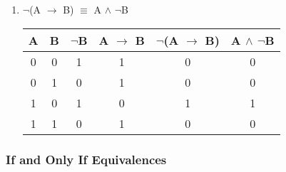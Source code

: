 \documentclass[12pt]{article}
\begin{document}
\begin{enumerate}
\begin{center}
\begin{tabular}{| c | c | c | c | c | c |}
  \end{tabular}

\end{center}



  \item $\neg$(A $\to$ B) $\equiv$ A $\land$ $\neg$B



\begin{center}

  \begin{tabular}{| c | c | c | c | c | c |}

    \hline

    A & B & $\neg$B & A $\to$ B & $\neg$(A $\to$ B) & A $\land$ $\neg$B \\ \hline

    0 & 0 & 1 & 1 & 0 & 0 \\

    0 & 1 & 0 & 1 & 0 & 0 \\

    1 & 0 & 1 & 0 & 1 & 1 \\

    1 & 1 & 0 & 1 & 0 & 0 \\ \hline

  \end{tabular}

\end{center}

\end{enumerate}



\subsubsection{If and Only If Equivalences}
\end{document}

